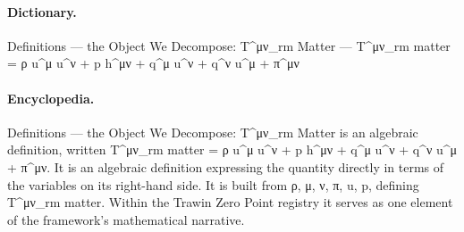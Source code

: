 \paragraph{Dictionary.}
Definitions — the Object We Decompose: T\textasciicircum{}μν\_rm Matter — T\textasciicircum{}μν\_rm matter = ρ u\textasciicircum{}μ u\textasciicircum{}ν + p h\textasciicircum{}μν + q\textasciicircum{}μ u\textasciicircum{}ν + q\textasciicircum{}ν u\textasciicircum{}μ + π\textasciicircum{}μν

\paragraph{Encyclopedia.}
Definitions — the Object We Decompose: T\textasciicircum{}μν\_rm Matter is an algebraic definition, written T\textasciicircum{}μν\_rm matter = ρ u\textasciicircum{}μ u\textasciicircum{}ν + p h\textasciicircum{}μν + q\textasciicircum{}μ u\textasciicircum{}ν + q\textasciicircum{}ν u\textasciicircum{}μ + π\textasciicircum{}μν. It is an algebraic definition expressing the quantity directly in terms of the variables on its right-hand side. It is built from ρ, μ, ν, π, u, p, defining T\textasciicircum{}μν\_rm matter. Within the Trawin Zero Point registry it serves as one element of the framework's mathematical narrative.
